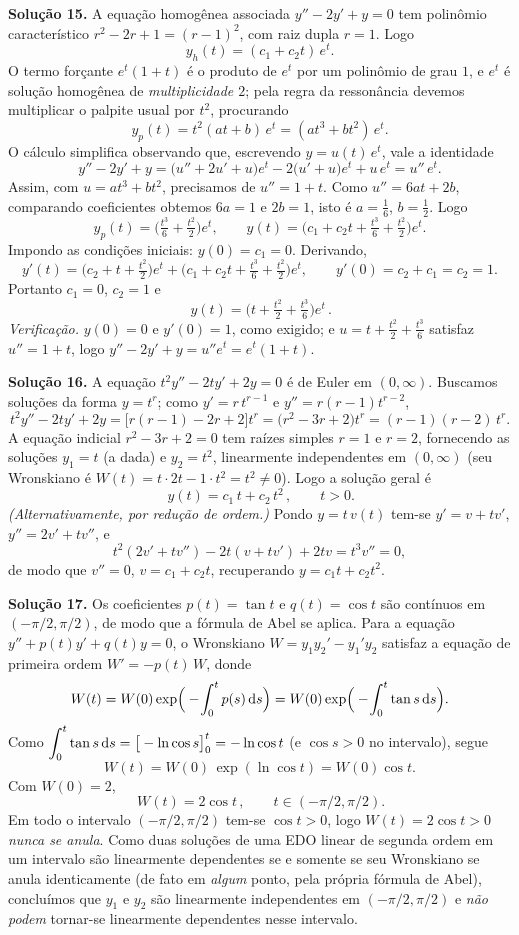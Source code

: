 \bigskip\noindent\textbf{Solução 15.}\quad
A equação homogênea associada $y''-2y'+y=0$ tem polinômio característico $r^2-2r+1=(r-1)^2$, com raiz dupla $r=1$. Logo
\[
y_h(t)=(c_1+c_2 t)\,e^t .
\]
O termo forçante $e^t(1+t)$ é o produto de $e^t$ por um polinômio de grau $1$, e $e^t$ é solução homogênea de \emph{multiplicidade $2$}; pela regra da ressonância devemos multiplicar o palpite usual por $t^2$, procurando
\[
y_p(t)=t^2(at+b)\,e^t=(at^3+bt^2)\,e^t .
\]
O cálculo simplifica observando que, escrevendo $y=u(t)\,e^t$, vale a identidade
\[
y''-2y'+y=\big(u''+2u'+u\big)e^t-2\big(u'+u\big)e^t+u\,e^t=u''\,e^t .
\]
Assim, com $u=at^3+bt^2$, precisamos de $u''=1+t$. Como $u''=6at+2b$, comparando coeficientes obtemos $6a=1$ e $2b=1$, isto é $a=\tfrac16$, $b=\tfrac12$. Logo
\[
y_p(t)=\Big(\tfrac{t^3}{6}+\tfrac{t^2}{2}\Big)e^t ,
\qquad
y(t)=\Big(c_1+c_2 t+\tfrac{t^3}{6}+\tfrac{t^2}{2}\Big)e^t .
\]
Impondo as condições iniciais: $y(0)=c_1=0$. Derivando,
\[
y'(t)=\Big(c_2+t+\tfrac{t^2}{2}\Big)e^t+\Big(c_1+c_2 t+\tfrac{t^3}{6}+\tfrac{t^2}{2}\Big)e^t,
\qquad y'(0)=c_2+c_1=c_2=1 .
\]
Portanto $c_1=0$, $c_2=1$ e
\[
\boxed{\,y(t)=\Big(t+\tfrac{t^2}{2}+\tfrac{t^3}{6}\Big)e^t\,}.
\]
\emph{Verificação.} $y(0)=0$ e $y'(0)=1$, como exigido; e $u=t+\tfrac{t^2}2+\tfrac{t^3}6$ satisfaz $u''=1+t$, logo $y''-2y'+y=u''e^t=e^t(1+t)$.


\bigskip\noindent\textbf{Solução 16.}\quad
A equação $t^2y''-2ty'+2y=0$ é de Euler em $(0,\infty)$. Buscamos soluções da forma $y=t^r$; como $y'=r\,t^{r-1}$ e $y''=r(r-1)t^{r-2}$,
\[
t^2y''-2ty'+2y=\big[r(r-1)-2r+2\big]t^r=\big(r^2-3r+2\big)t^r=(r-1)(r-2)\,t^r .
\]
A equação indicial $r^2-3r+2=0$ tem raízes simples $r=1$ e $r=2$, fornecendo as soluções $y_1=t$ (a dada) e $y_2=t^2$, linearmente independentes em $(0,\infty)$ (seu Wronskiano é $W(t)=t\cdot 2t-1\cdot t^2=t^2\neq0$). Logo a solução geral é
\[
\boxed{\,y(t)=c_1\,t+c_2\,t^2\,},\qquad t>0 .
\]
\emph{(Alternativamente, por redução de ordem.)} Pondo $y=t\,v(t)$ tem-se $y'=v+tv'$, $y''=2v'+tv''$, e
\[
t^2(2v'+tv'')-2t(v+tv')+2tv=t^3v''=0,
\]
de modo que $v''=0$, $v=c_1+c_2 t$, recuperando $y=c_1 t+c_2 t^2$.


\bigskip\noindent\textbf{Solução 17.}\quad
Os coeficientes $p(t)=\tan t$ e $q(t)=\cos t$ são contínuos em $(-\pi/2,\pi/2)$, de modo que a fórmula de Abel se aplica. Para a equação $y''+p(t)y'+q(t)y=0$, o Wronskiano $W=y_1y_2'-y_1'y_2$ satisfaz a equação de primeira ordem $W'=-p(t)\,W$, donde
\[
W(t)=W(0)\exp\!\Big(-\!\int_0^t p(s)\,\mathrm{d} s\Big)=W(0)\exp\!\Big(-\!\int_0^t \tan s\,\mathrm{d} s\Big).
\]
Como $\displaystyle\int_0^t \tan s\,\mathrm{d} s=\big[-\ln\cos s\big]_0^t=-\ln\cos t$ (e $\cos s>0$ no intervalo), segue
\[
W(t)=W(0)\,\exp(\ln\cos t)=W(0)\cos t .
\]
Com $W(0)=2$,
\[
\boxed{\,W(t)=2\cos t\,},\qquad t\in(-\pi/2,\pi/2).
\]
Em todo o intervalo $(-\pi/2,\pi/2)$ tem-se $\cos t>0$, logo $W(t)=2\cos t>0$ \emph{nunca se anula}. Como duas soluções de uma EDO linear de segunda ordem em um intervalo são linearmente dependentes se e somente se seu Wronskiano se anula identicamente (de fato em \emph{algum} ponto, pela própria fórmula de Abel), concluímos que $y_1$ e $y_2$ são linearmente independentes em $(-\pi/2,\pi/2)$ e \emph{não podem} tornar-se linearmente dependentes nesse intervalo.



